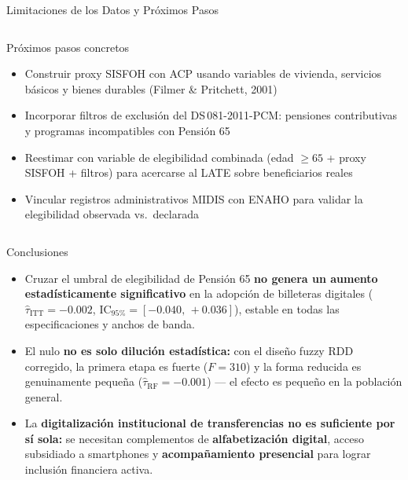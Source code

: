 \documentclass[aspectratio=169, 10pt]{beamer}
\begin{document}
\begin{frame}{Limitaciones de los Datos y Próximos Pasos}
\begin{columns}[T]
      \begin{block}{Próximos pasos concretos}
        \footnotesize
        \begin{itemize}
          \setlength\itemsep{4pt}
          \item Construir proxy SISFOH con ACP usando variables de
                vivienda, servicios básicos y bienes durables
                (Filmer \& Pritchett, 2001)
          \item Incorporar filtros de exclusión del
                DS\,081-2011-PCM: pensiones contributivas y
                programas incompatibles con Pensión 65
          \item Reestimar con variable de elegibilidad combinada
                (edad $\geq 65$ + proxy SISFOH + filtros)
                para acercarse al LATE sobre beneficiarios reales
          \item Vincular registros administrativos MIDIS con ENAHO
                para validar la elegibilidad observada vs.\ declarada
        \end{itemize}
      \end{block}
  \end{columns}
\end{frame}

\begin{frame}{Conclusiones}
  \begin{itemize}
    \setlength\itemsep{14pt}
    \item Cruzar el umbral de elegibilidad de Pensión 65
          \textbf{no genera un aumento estadísticamente significativo}
          en la adopción de billeteras digitales
          ($\hat{\tau}_{\text{ITT}} = -0.002$,
           IC$_{95\%} = [-0.040,\,+0.036]$),
          estable en todas las especificaciones y anchos de banda.

    \item El nulo \textbf{no es solo dilución estadística:}
          con el diseño fuzzy RDD corregido,
          la primera etapa es fuerte ($F = 310$) y la
          forma reducida es genuinamente pequeña
          ($\hat{\tau}_{\text{RF}} = -0.001$) —
          el efecto es pequeño en la población general.

    \item La \textbf{digitalización institucional de transferencias
          no es suficiente por sí sola:}
          se necesitan complementos de
          \textbf{alfabetización digital},
          acceso subsidiado a smartphones y
          \textbf{acompañamiento presencial}
          para lograr inclusión financiera activa.
  \end{itemize}
\end{frame}
\end{document}
